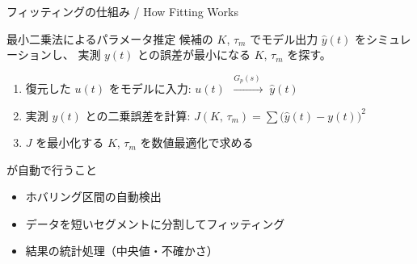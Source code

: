 \begin{frame}{フィッティングの仕組み / How Fitting Works}
  \begin{block}{最小二乗法によるパラメータ推定}
    {\small
    候補の $K$, $\tau_m$ でモデル出力 $\hat{y}(t)$ をシミュレーションし、
    実測 $y(t)$ との誤差が最小になる $K$, $\tau_m$ を探す。
    }
  \end{block}

  \vspace{0.3em}

  {\footnotesize
  \begin{enumerate}\setlength{\itemsep}{2pt}
    \item 復元した $u(t)$ をモデルに入力:
          \quad $u(t) \;\xrightarrow{\;G_p(s)\;}\; \hat{y}(t)$
    \item 実測 $y(t)$ との二乗誤差を計算:
          \quad $J(K,\,\tau_m) = \sum \bigl(\hat{y}(t) - y(t)\bigr)^2$
    \item $J$ を最小化する $K$, $\tau_m$ を数値最適化で求める
  \end{enumerate}
  }

  \vspace{0.3em}

  \begin{exampleblock}{ が自動で行うこと}
    {\footnotesize
    \begin{itemize}\setlength{\itemsep}{0pt}
      \item ホバリング区間の自動検出
      \item データを短いセグメントに分割してフィッティング
      \item 結果の統計処理（中央値・不確かさ）
    \end{itemize}
    }
  \end{exampleblock}
\end{frame}

